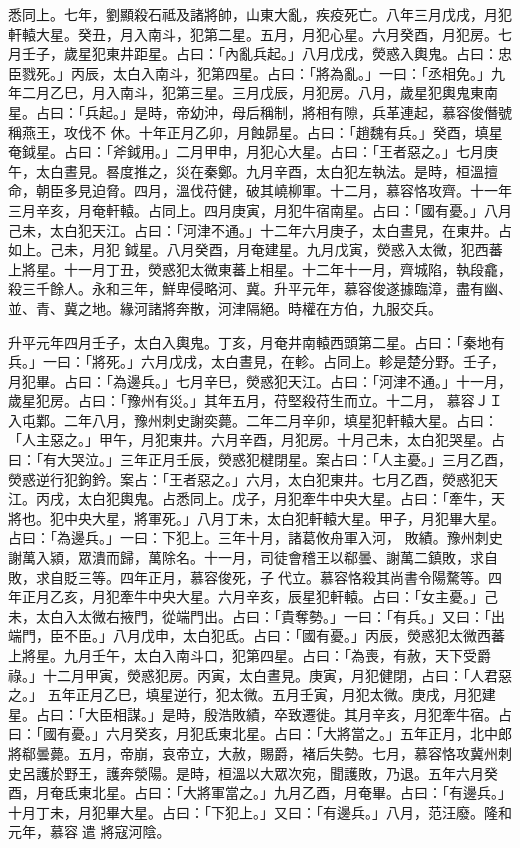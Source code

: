 \begin{pinyinscope}
 悉同上。七年，劉顯殺石祗及諸將帥，山東大亂，疾疫死亡。八年三月戊戌，月犯軒轅大星。癸丑，月入南斗，犯第二星。五月，月犯心星。六月癸酉，月犯房。七月壬子，歲星犯東井距星。占曰：「內亂兵起。」八月戊戌，熒惑入輿鬼。占曰：忠臣戮死。」丙辰，太白入南斗，犯第四星。占曰：「將為亂。」一曰：「丞相免。」九年二月乙巳，月入南斗，犯第三星。三月戊辰，月犯房。八月，歲星犯輿鬼東南星。占曰：「兵起。」是時，帝幼沖，母后稱制，將相有隙，兵革連起，慕容俊僭號稱燕王，攻伐不
 休。十年正月乙卯，月蝕昴星。占曰：「趙魏有兵。」癸酉，填星奄鉞星。占曰：「斧鉞用。」二月甲申，月犯心大星。占曰：「王者惡之。」七月庚午，太白晝見。晷度推之，災在秦鄭。九月辛酉，太白犯左執法。是時，桓溫擅命，朝臣多見迫脅。四月，溫伐苻健，破其嶢柳軍。十二月，慕容恪攻齊。十一年三月辛亥，月奄軒轅。占同上。四月庚寅，月犯牛宿南星。占曰：「國有憂。」八月己未，太白犯天江。占曰：「河津不通。」十二年六月庚子，太白晝見，在東井。占如上。己未，月犯
 鉞星。八月癸酉，月奄建星。九月戊寅，熒惑入太微，犯西蕃上將星。十一月丁丑，熒惑犯太微東蕃上相星。十二年十一月，齊城陷，執段龕，殺三千餘人。永和三年，鮮卑侵略河、冀。升平元年，慕容俊遂據臨漳，盡有幽、並、青、冀之地。緣河諸將奔散，河津隔絕。時權在方伯，九服交兵。



 升平元年四月壬子，太白入輿鬼。丁亥，月奄井南轅西頭第二星。占曰：「秦地有兵。」一曰：「將死。」六月戊戌，太白晝見，在軫。占同上。軫是楚分野。壬子，月犯畢。占曰：「為邊兵。」七月辛巳，熒惑犯天江。占曰：「河津不通。」十一月，歲星犯房。占曰：「豫州有災。」其年五月，苻堅殺苻生而立。十二月，
 慕容ＪＩ入屯鄴。二年八月，豫州刺史謝奕薨。二年二月辛卯，填星犯軒轅大星。占曰：「人主惡之。」甲午，月犯東井。六月辛酉，月犯房。十月己未，太白犯哭星。占曰：「有大哭泣。」三年正月壬辰，熒惑犯楗閉星。案占曰：「人主憂。」三月乙酉，熒惑逆行犯鉤鈐。案占：「王者惡之。」六月，太白犯東井。七月乙酉，熒惑犯天江。丙戌，太白犯輿鬼。占悉同上。戊子，月犯牽牛中央大星。占曰：「牽牛，天將也。犯中央大星，將軍死。」八月丁未，太白犯軒轅大星。甲子，月犯畢大星。占曰：「為邊兵。」一曰：下犯上。三年十月，諸葛攸舟軍入河，
 敗績。豫州刺史謝萬入潁，眾潰而歸，萬除名。十一月，司徒會稽王以郗曇、謝萬二鎮敗，求自敗，求自貶三等。四年正月，慕容俊死，子代立。慕容恪殺其尚書令陽騖等。四年正月乙亥，月犯牽牛中央大星。六月辛亥，辰星犯軒轅。占曰：「女主憂。」己未，太白入太微右掖門，從端門出。占曰：「貴奪勢。」一曰：「有兵。」又曰：「出端門，臣不臣。」八月戊申，太白犯氐。占曰：「國有憂。」丙辰，熒惑犯太微西蕃上將星。九月壬午，太白入南斗口，犯第四星。占曰：「為喪，有赦，天下受爵祿。」十二月甲寅，熒惑犯房。丙寅，太白晝見。庚寅，月犯健閉，占曰：「人君惡之。」
 五年正月乙巳，填星逆行，犯太微。五月壬寅，月犯太微。庚戌，月犯建星。占曰：「大臣相謀。」是時，殷浩敗績，卒致遷徙。其月辛亥，月犯牽牛宿。占曰：「國有憂。」六月癸亥，月犯氐東北星。占曰：「大將當之。」五年正月，北中郎將郗曇薨。五月，帝崩，哀帝立，大赦，賜爵，褚后失勢。七月，慕容恪攻冀州刺史呂護於野王，護奔滎陽。是時，桓溫以大眾次宛，聞護敗，乃退。五年六月癸酉，月奄氐東北星。占曰：「大將軍當之。」九月乙酉，月奄畢。占曰：「有邊兵。」十月丁未，月犯畢大星。占曰：「下犯上。」又曰：「有邊兵。」八月，范汪廢。隆和元年，慕容遣
 將寇河陰。




\end{pinyinscope}
